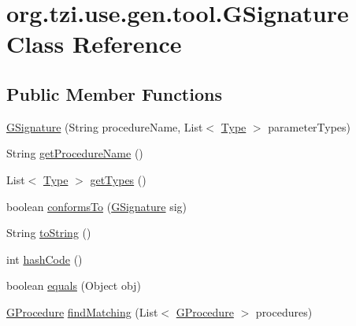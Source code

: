 \hypertarget{classorg_1_1tzi_1_1use_1_1gen_1_1tool_1_1_g_signature}{\section{org.\-tzi.\-use.\-gen.\-tool.\-G\-Signature Class Reference}
\label{classorg_1_1tzi_1_1use_1_1gen_1_1tool_1_1_g_signature}
}
\subsection*{Public Member Functions}
\begin{DoxyCompactItemize}
\item 
\hyperlink{classorg_1_1tzi_1_1use_1_1gen_1_1tool_1_1_g_signature_afc212bdf982e3dc6c608516847e3a6ac}{G\-Signature} (String procedure\-Name, List$<$ \hyperlink{interfaceorg_1_1tzi_1_1use_1_1uml_1_1ocl_1_1type_1_1_type}{Type} $>$ parameter\-Types)
\item 
String \hyperlink{classorg_1_1tzi_1_1use_1_1gen_1_1tool_1_1_g_signature_a26322d4bc88a785090cffec535d2de6d}{get\-Procedure\-Name} ()
\item 
List$<$ \hyperlink{interfaceorg_1_1tzi_1_1use_1_1uml_1_1ocl_1_1type_1_1_type}{Type} $>$ \hyperlink{classorg_1_1tzi_1_1use_1_1gen_1_1tool_1_1_g_signature_a08c3d8d845300bcb7895db7f1a44a416}{get\-Types} ()
\item 
boolean \hyperlink{classorg_1_1tzi_1_1use_1_1gen_1_1tool_1_1_g_signature_a63b921f0a566af7f2c64e7d4b7414ed3}{conforms\-To} (\hyperlink{classorg_1_1tzi_1_1use_1_1gen_1_1tool_1_1_g_signature}{G\-Signature} sig)
\item 
String \hyperlink{classorg_1_1tzi_1_1use_1_1gen_1_1tool_1_1_g_signature_afccc9b46078eed1ef44fcd7406d3acd1}{to\-String} ()
\item 
int \hyperlink{classorg_1_1tzi_1_1use_1_1gen_1_1tool_1_1_g_signature_adf4ca9cba367e703c4fc5a510983ffd7}{hash\-Code} ()
\item 
boolean \hyperlink{classorg_1_1tzi_1_1use_1_1gen_1_1tool_1_1_g_signature_a7fc57ee3029c42b2d7556478c89b450f}{equals} (Object obj)
\item 
\hyperlink{classorg_1_1tzi_1_1use_1_1gen_1_1assl_1_1statics_1_1_g_procedure}{G\-Procedure} \hyperlink{classorg_1_1tzi_1_1use_1_1gen_1_1tool_1_1_g_signature_afe318fb265493fc0dfcfdd3740fc41e6}{find\-Matching} (List$<$ \hyperlink{classorg_1_1tzi_1_1use_1_1gen_1_1assl_1_1statics_1_1_g_procedure}{G\-Procedure} $>$ procedures)
\end{DoxyCompactItemize}


